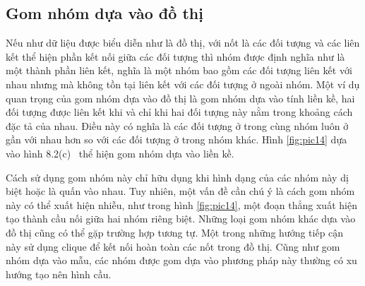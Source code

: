 \subsection{Gom nhóm dựa vào đồ thị}
Nếu như dữ liệu được biểu diễn như là đồ thị, với nốt là các đối tượng và các liên kết thể hiện phần kết nối giữa các đối tượng thì nhóm được định nghĩa như là một thành phần liên kết, nghĩa là một nhóm bao gồm các đối tượng liên kết với nhau nhưng mà không tồn tại liên kết với các đối tượng ở ngoài nhóm.
Một ví dụ quan trọng của gom nhóm dựa vào đồ thị là gom nhóm dựa vào tính liền kề, hai đối tượng được liên kết khi và chỉ khi hai đối tượng này nằm trong khoảng cách đặc tả của nhau.
Điều này có nghĩa là các đối tượng ở trong cùng nhóm luôn ở gần với nhau hơn so với các đối tượng ở trong nhóm khác.
Hình \ref{fig:pic14} dựa vào hình 8.2(c)~\cite{Vipin-Kumar} thể hiện gom nhóm dựa vào liền kề.

Cách sử dụng gom nhóm này chỉ hữu dụng khi hình dạng của các nhóm này dị biệt hoặc là quấn vào nhau.
Tuy nhiên, một vấn đề cần chú ý là cách gom nhóm này có thể xuất hiện nhiễu, như trong hình \ref{fig:pic14}, một đoạn thẳng xuất hiện tạo thành cầu nối giữa hai nhóm riêng biệt.
Những loại gom nhóm khác dựa vào đồ thị cũng có thể gặp trường hợp tương tự.
Một trong những hướng tiếp cận này sử dụng clique để kết nối hoàn toàn các nốt trong đồ thị.
Cũng như gom nhóm dựa vào mẫu, các nhóm được gom dựa vào phương pháp này thường có xu hướng tạo nên hình cầu.

